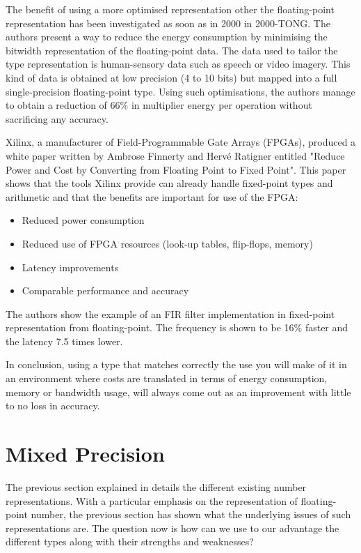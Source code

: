 
The benefit of using a more optimised representation other the floating-point representation has been investigated as soon as in 2000 in 2000-TONG. The authors present a way to reduce the energy consumption by minimising the bitwidth representation of the floating-point data. The data used to tailor the type representation is human-sensory data such as speech or video imagery. This kind of data is obtained at low precision (4 to 10 bits) but mapped into a full single-precision floating-point type. Using such optimisations, the authors manage to obtain a reduction of 66\% in multiplier energy per operation without sacrificing any accuracy.

Xilinx, a manufacturer of Field-Programmable Gate Arrays (FPGAs), produced a white paper written by Ambrose Finnerty and Hervé Ratigner entitled "Reduce Power and Cost by Converting from Floating Point to Fixed Point". This paper shows that the tools Xilinx provide can already handle fixed-point types and arithmetic and that the benefits are important for use of the FPGA:
\begin{itemize}
  \item Reduced power consumption
  \item Reduced use of FPGA resources (look-up tables, flip-flops, memory)
  \item Latency improvements
  \item Comparable performance and accuracy
\end{itemize}
The authors show the example of an FIR filter implementation in fixed-point representation from floating-point. The frequency is shown to be 16\% faster and the latency 7.5 times lower.

In conclusion, using a type that matches correctly the use you will make of it in an environment where costs are translated in terms of energy consumption, memory or bandwidth usage, will always come out as an improvement with little to no loss in accuracy.


\section{Mixed Precision}

The previous section explained in details the different existing number representations. With a particular emphasis on the representation of floating-point number, the previous section has shown what the underlying issues of such representations are. The question now is how can we use to our advantage the different types along with their strengths and weaknesses?

